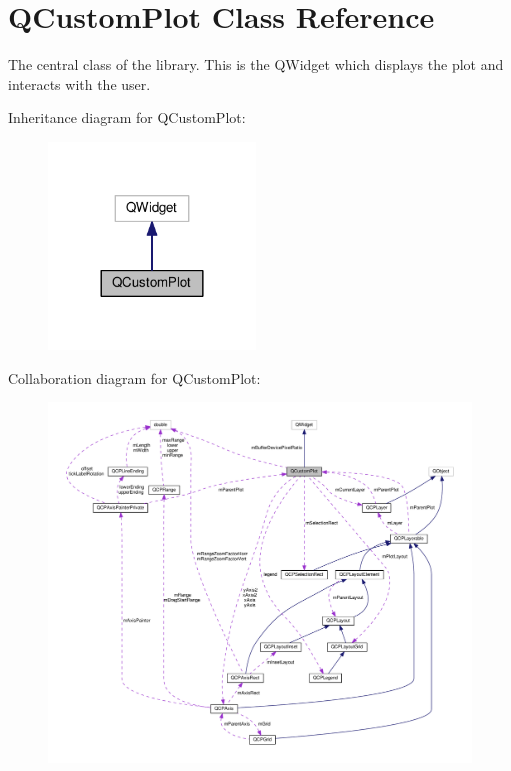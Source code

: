 \hypertarget{classQCustomPlot}{}\section{Q\+Custom\+Plot Class Reference}
\label{classQCustomPlot}


The central class of the library. This is the Q\+Widget which displays the plot and interacts with the user.  




Inheritance diagram for Q\+Custom\+Plot\+:
\nopagebreak
\begin{figure}[H]
\begin{center}
\leavevmode
\includegraphics[width=156pt]{classQCustomPlot__inherit__graph}
\end{center}
\end{figure}


Collaboration diagram for Q\+Custom\+Plot\+:
\nopagebreak
\begin{figure}[H]
\begin{center}
\leavevmode
\includegraphics[width=350pt]{classQCustomPlot__coll__graph}
\end{center}
\end{figure}
